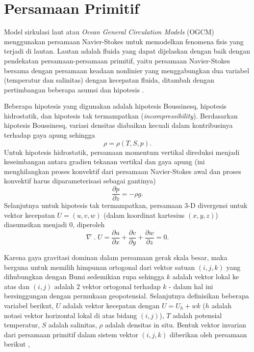 \section[Persamaan Primitif]{Persamaan Primitif}
\begin{spacing}{1.5}
	\par Model sirkulasi laut atau \textit{Ocean General Circulation Models} (OGCM) menggunakan persamaan Navier-Stokes untuk memodelkan fenomena fisis yang terjadi di lautan. Lautan adalah fluida yang dapat dijelaskan dengan baik dengan pendekatan persamaan-persamaan primitif, yaitu persamaan Navier-Stokes bersama dengan persamaan keadaan nonlinier yang menggabungkan dua variabel (temperatur dan salinitas) dengan kecepatan fluida, ditambah dengan pertimbangan beberapa asumsi dan hipotesis .
	
	Beberapa hipotesis yang digunakan adalah hipotesis Boussinesq, hipotesis hidrostatik, dan hipotesis tak termampatkan (\textit{incompressibility}). Berdasarkan hipotesis Boussinesq, variasi densitas diabaikan kecuali dalam kontribusinya terhadap gaya apung sehingga 
	\begin{equation}\label{eq:P1}
		\rho = \rho(T,S,p).
	\end{equation}
	Untuk hipotesis hidrostatik, persamaan momentum vertikal direduksi menjadi keseimbangan antara gradien tekanan vertikal dan gaya apung (ini menghilangkan proses konvektif dari persamaan Navier-Stokes awal dan proses konvektif harus diparameterisasi sebagai gantinya)
	\begin{equation}
		\frac{\partial p}{\partial z} = -\rho g.
	\end{equation}
	Selanjutnya untuk hipotesis tak termampatkan, persamaan 3-D divergensi untuk vektor kecepatan $U = (u,v,w)$ (dalam koordinat kartesius $(x,y,z)$) diasumsikan menjadi 0, diperoleh
	\begin{equation}
		\nabla \;.\; U =\frac{\partial u}{\partial x} + \frac{\partial v}{\partial y} + \frac{\partial w}{\partial z} = 0.
	\end{equation}	

	Karena gaya gravitasi dominan dalam persamaan gerak skala besar, maka berguna untuk memilih himpunan ortogonal dari vektor satuan $(i,j,k)$ yang dihubungkan dengan Bumi sedemikian rupa sehingga $k$ adalah vektor lokal ke atas dan $(i,j)$ adalah 2 vektor ortogonal terhadap $k$ - dalam hal ini bersinggungan dengan permukaan geopotensial. Selanjutnya definisikan beberapa variabel berikut, $U$ adalah vektor kecepatan dengan $U = U_h + wk$ ($h$ adalah notasi vektor horizontal lokal di atas bidang $(i,j)$), $T$ adalah potensial temperatur, $S$ adalah salinitas, $\rho$ adalah densitas in situ. Bentuk vektor invarian dari persamaan primitif dalam sistem vektor $(i, j, k)$ diberikan oleh persamaan berikut ,
	

\end{spacing}
